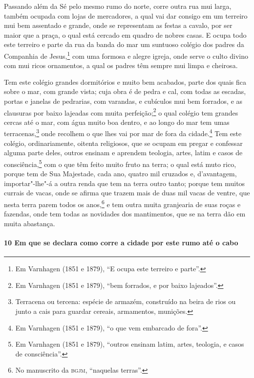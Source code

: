 Passando além da Sé pelo mesmo rumo do norte, corre outra rua mui larga, também ocupada
com lojas de mercadores, a qual vai dar consigo em um terreiro mui bem assentado e grande,
onde se representam as festas a cavalo, por ser maior que a praça, o qual está cercado em
quadro de nobres casas. E ocupa todo este terreiro e parte da rua da banda do mar um
suntuoso colégio dos padres da Companhia de Jesus,\footnote{ Em Varnhagen (1851 e 1879),
``E ocupa este terreiro e parte''.} com uma formosa e alegre igreja, onde serve o culto
divino com mui ricos ornamentos, a qual os padres têm sempre mui limpa e cheirosa.

Tem este colégio grandes dormitórios e muito bem acabados, parte dos quais fica sobre o
mar, com grande vista; cuja obra é de pedra e cal, com todas as escadas, portas e janelas
de pedrarias, com varandas, e cubículos mui bem forrados, e as clausuras por baixo
lajeadas com muita perfeição;\footnote{ Em Varnhagen (1851 e 1879), ``bem forrados, e por
baixo lajeados''.} o qual colégio tem grandes cercas até o mar, com água muito boa dentro,
e ao longo do mar tem umas terracenas,\footnote{ Terracena ou tercena: espécie de armazém,
construído na beira de rios ou junto a cais para guardar cereais, armamentos, munições.}
onde recolhem o que lhes vai por mar de fora da cidade.\footnote{ Em Varnhagen (1851 e
1879), ``o que vem embarcado de fora''.} Tem este colégio, ordinariamente, oitenta
religiosos, que se ocupam em pregar e confessar alguma parte deles, outros ensinam e
aprendem teologia, artes, latim e casos de consciência,\footnote{ Em Varnhagen (1851 e
1879), ``outros ensinam latim, artes, teologia, e casos de consciência''.} com o que têm
feito muito fruto na terra; o qual está muto rico, porque tem de Sua Majestade, cada ano,
quatro mil cruzados e, d'avantagem, importar"-lhe"-á a outra renda que tem na terra outro
tanto; porque tem muitos currais de vacas, onde se afirma que trazem mais de duas mil
vacas de ventre, que nesta terra parem todos os anos,\footnote{ No manuscrito da
\textsc{bgjm}, ``naquelas terras''.} e tem outra muita granjearia de suas roças e
fazendas, onde tem todas as novidades dos mantimentos, que se na terra dão em muita
abastança.

\paragraph{10 Em que se declara como corre a cidade por este rumo até o cabo}

